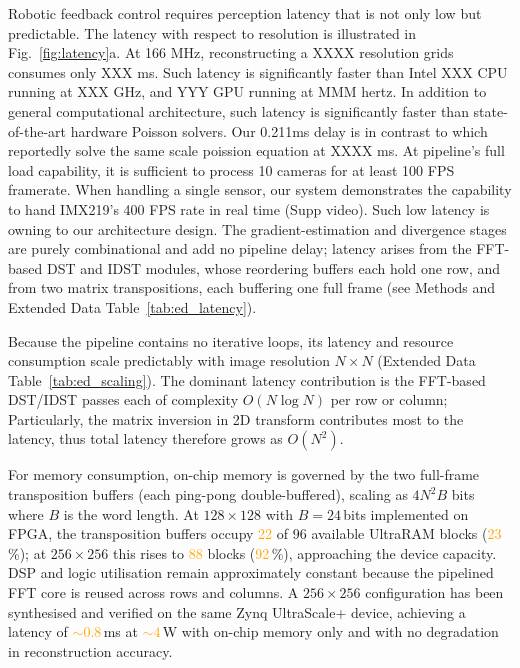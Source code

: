 \documentclass[10pt,a4paper]{article}
\newcommand{\placeholder}[1]{\textcolor{orange}{#1}}
\begin{document}
Robotic feedback control requires perception latency that is not only low but predictable. The latency with respect to resolution is illustrated in Fig.~\ref{fig:latency}a. At 166 MHz, reconstructing a XXXX resolution grids consumes only XXX ms. Such latency is significantly faster than Intel XXX CPU running at XXX GHz, and YYY GPU running at MMM hertz. In addition to general computational architecture, such latency is significantly faster than state-of-the-art hardware Poisson solvers. Our 0.211ms delay is in contrast to \cite{XXX} which  reportedly solve the same scale poission equation at XXXX ms. At pipeline's full load capability, it is sufficient to process 10 cameras for at least 100 FPS framerate. When handling a single sensor, our system demonstrates the capability to hand IMX219's 400 FPS rate in real time (Supp video). Such low latency is owning to our architecture design. The gradient-estimation and divergence stages are purely combinational and add no pipeline delay; latency arises from the FFT-based DST and IDST modules, whose reordering buffers each hold one row, and from two matrix transpositions, each buffering one full frame (see Methods and Extended Data Table~\ref{tab:ed_latency}). 




Because the pipeline contains no iterative loops, its latency and resource consumption scale predictably with image resolution $N \times N$ (Extended Data Table~\ref{tab:ed_scaling}). The dominant latency contribution is the FFT-based DST/IDST passes each of complexity $O(N \log N)$ per row or column; Particularly, the matrix inversion in 2D transform contributes most to the latency, thus total latency therefore grows as $O(N^2)$. 

For memory consumption, on-chip memory is governed by the two full-frame transposition buffers (each ping-pong double-buffered), scaling as $4 N^2 B$ bits where $B$ is the word length. At $128 \times 128$ with $B = 24$\,bits implemented on FPGA, the transposition buffers occupy \placeholder{22} of 96 available UltraRAM blocks (\placeholder{23}\,\%); at $256 \times 256$ this rises to \placeholder{88} blocks (\placeholder{92}\,\%), approaching the device capacity. DSP and logic utilisation remain approximately constant because the pipelined FFT core is reused across rows and columns. A $256 \times 256$ configuration has been synthesised and verified on the same Zynq UltraScale+ device, achieving a latency of \placeholder{${\sim}0.8$}\,ms at \placeholder{${\sim}4$}\,W with on-chip memory only and with no degradation in reconstruction accuracy.
\end{document}
